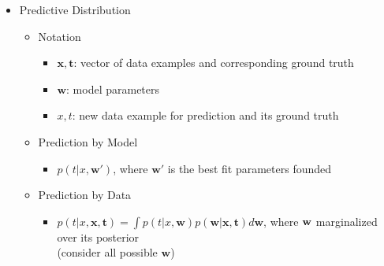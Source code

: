 \begin{itemize}
\item Predictive Distribution
	\begin{itemize}
	\item Notation
		\begin{itemize}
		\item $\mathbf x, \mathbf t$: vector of data examples and corresponding ground truth
		\item $\mathbf w$: model parameters
		\item $x, t$: new data example for prediction and its ground truth
		\end{itemize}
	\item Prediction by Model
		\begin{itemize}
		\item $p(t|x, \mathbf w')$, where $\mathbf w'$ is the best fit parameters founded
		\end{itemize}
	\item Prediction by Data
		\begin{itemize}
		\item $\displaystyle p(t|x,\mathbf{x},\mathbf{t}) = \int p(t|x,\mathbf{w})p(\mathbf{w}|\mathbf{x},\mathbf{t}) d\mathbf w$, where $\bf w$ marginalized over its posterior \\
		(consider all possible $\mathbf w$)
		\end{itemize}
	\end{itemize}


\end{itemize}
